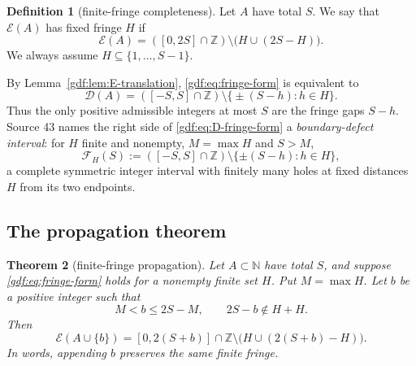 \documentclass[11pt,a4paper]{article}
\numberwithin{equation}{section}
\newtheorem{theorem}{Theorem}[section]
\theoremstyle{definition}
\newtheorem{definition}[theorem]{Definition}
\theoremstyle{remark}
\theoremstyle{plain}
\newcommand{\Z}{\mathbb Z}
\newcommand{\N}{\mathbb N}
\newcommand{\cD}{\mathcal D}
\newcommand{\cE}{\mathcal E}
\newcommand{\cF}{\mathcal F}
\begin{document}
\begin{definition}[finite-fringe completeness]\label{gdf:def:fringe}
Let $A$ have total $S$.  We say that $\cE(A)$ has fixed fringe $H$ if
\begin{equation}\label{gdf:eq:fringe-form}
 \cE(A)=([0,2S]\cap\Z)\setminus\bigl(H\cup(2S-H)\bigr).
\end{equation}
We always assume $H\subseteq\{1,\dots,S-1\}$.
\end{definition}

By Lemma~\ref{gdf:lem:E-translation}, \eqref{gdf:eq:fringe-form} is equivalent to
\begin{equation}\label{gdf:eq:D-fringe-form}
 \cD(A)=([-S,S]\cap\Z)\setminus
 \bigl\{\pm(S-h):h\in H\bigr\}.
\end{equation}
Thus the only positive admissible integers at most $S$ are the fringe gaps
$S-h$.  Source 43 names the right side of \eqref{gdf:eq:D-fringe-form} a
\emph{boundary-defect interval}: for $H$ finite and nonempty, $M=\max H$ and
$S>M$,
\begin{equation}\label{gdf:eq:FH}
 \cF_H(S):=([-S,S]\cap\Z)\setminus\{\pm(S-h):h\in H\},
\end{equation}
a complete symmetric integer interval with finitely many holes at fixed
distances $H$ from its two endpoints.

\subsection{The propagation theorem}

\begin{theorem}[finite-fringe propagation]\label{gdf:thm:fringe-propagation}
Let $A\subset\N$ have total $S$, and suppose \eqref{gdf:eq:fringe-form} holds for a
nonempty finite set $H$.  Put $M=\max H$.  Let $b$ be a positive integer such
that
\begin{equation}\label{gdf:eq:prop-conditions}
 M<b\le2S-M,
 \qquad
 2S-b\notin H+H.
\end{equation}
Then
\begin{equation}\label{gdf:eq:prop-conclusion}
 \cE(A\cup\{b\})=
 [0,2(S+b)]\cap\Z\setminus
 \bigl(H\cup(2(S+b)-H)\bigr).
\end{equation}
In words, appending $b$ preserves the same finite fringe.
\end{theorem}
\end{document}
